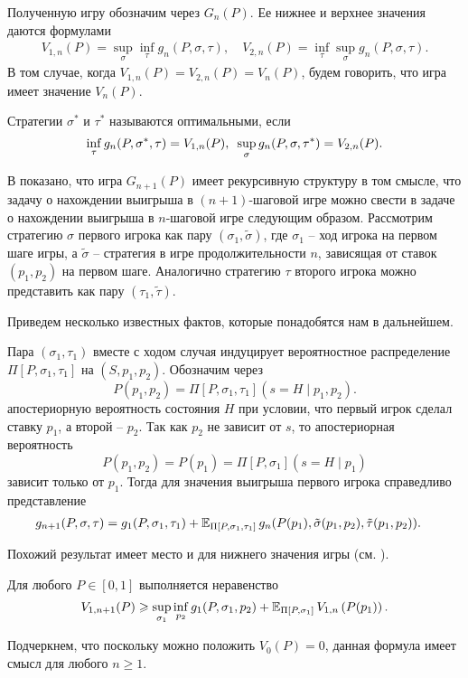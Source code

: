 {Полученную игру обозначим через $G_n(P)$.
Ее нижнее и верхнее значения даются формулами
\begin{align*}
  V_{1,n}(P) = \sup_\sigma \inf_\tau g_n(P, \sigma, \tau), \quad
  V_{2,n}(P) = \inf_\tau \sup_\sigma g_n(P, \sigma, \tau).
\end{align*}
В том случае, когда $V_{1,n}(P) = V_{2,n}(P) = V_n(P)$, будем говорить, что игра имеет значение $V_n(P)$.

Стратегии $\sigma^*$ и $\tau^*$ называются оптимальными, если
\[
\inf_\tau g_n(P, \sigma^*, \tau) = V_{1,n}(P), \enskip
\sup_\sigma g_n(P, \sigma, \tau^*) = V_{2,n}(P).
\]

В \cite{demeyer02} показано, что игра $G_{n+1}(P)$ имеет рекурсивную структуру в том смысле, что задачу о нахождении выигрыша в $(n+1)$-шаговой игре можно свести в задаче о нахождении выигрыша в $n$-шаговой игре следующим образом.
Рассмотрим стратегию $\sigma$ первого игрока как пару $(\sigma_1, \tilde{\sigma})$, где $\sigma_1$ -- ход игрока на первом шаге игры, а $\tilde{\sigma}$ -- стратегия в игре продолжительности $n$, зависящая от ставок $(p_1, p_2)$ на первом шаге.
Аналогично стратегию $\tau$ второго игрока можно представить как пару $(\tau_1, \tilde{\tau})$.

Приведем несколько известных фактов, которые понадобятся нам в дальнейшем.

Пара $(\sigma_1, \tau_1)$ вместе с ходом случая индуцирует вероятностное
распределение $\Pi[P, \sigma_1, \tau_1]$ на $(S, p_1, p_2)$. Обозначим через
\[
  P(p_1, p_2) = \Pi[P, \sigma_1, \tau_1](s = H \;|\; p_1, p_2).
\]
апостериорную вероятность состояния $H$ при условии, что первый игрок сделал ставку $p_1$, а второй -- $p_2$.
Так как $p_2$ не зависит от $s$, то апостериорная вероятность
\[
P(p_1,p_2) = P(p_1) = \Pi[P, \sigma_1](s = H \; | \; p_1)
\]
зависит только от $p_1$.
Тогда для значения выигрыша первого игрока справедливо представление
\begin{align*}
  g_{n+1}(P, \sigma, \tau) &= g_1(P, \sigma_1, \tau_1) +
 \operatorname{\mathbb{E}}_{\Pi[P, \sigma_1, \tau_1]}
    g_n(P(p_1), \tilde{\sigma}(p_1, p_2), \tilde{\tau}(p_1, p_2)).
\end{align*}

Похожий результат имеет место и для нижнего значения игры (см. \cite{demeyer02}).
\begin{lemma}
  \label{lemma:lowerBound:general}
  Для любого $P \in [0, 1]$ выполняется неравенство
  \begin{equation}
    \label{eq:fp:lowerB:nonParameterized}
    V_{1,n+1}(P) \geqslant \sup_{\sigma_1} \inf_{p_2} g_1(P, \sigma_1, p_2)
    + \operatorname{\mathbb{E}}_{\Pi[P, \sigma_1]} V_{1,n}\left( P(p_1) \right).
  \end{equation}
\end{lemma}
Подчеркнем, что поскольку можно положить $V_0(P) = 0$, данная формула имеет смысл для любого $n \geqslant 1$.

}
